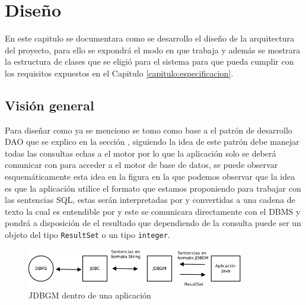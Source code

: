 \chapter{Diseño}\label{cap:disenio}

En este capitulo se documentara como se desarrollo el diseño de la arquitectura del proyecto, para ello se expondrá el modo en que trabaja \jd y además se mostrara la estructura de clases que se eligió para el sistema para que pueda cumplir con los requisitos expuestos en el Capitulo \ref{capitulo:especificacion}.





\section{Visión general}

Para diseñar \jj como ya se menciono se tomo como base a el patrón de desarrollo DAO que se explico en la sección , siguiendo la idea de este patrón \jj debe manejar todas las consultas echas a el motor por lo que la aplicación solo se deberá comunicar con \jj para acceder a el motor de base de datos, se puede observar esquemáticamente esta idea en la figura  en la que podemos observar que la idea es que la aplicación utilice el formato que estamos proponiendo para trabajar con las sentencias SQL, estas serán interpretadas por \jj y convertidas a una cadena de texto la cual es entendible por \jd y este se comunicara directamente con el DBMS y pondrá a disposición de \jj el resultado que dependiendo de la consulta puede ser un objeto del tipo \verb=ResultSet= o un tipo \verb=integer=. 

\begin{figure}
  \centering
    \includegraphics[width=0.85\textwidth]{figuras/jdbgm-overview.png}
  \caption{JDBGM dentro de una aplicación}
  \label{fig:jdbgm:overview}
\end{figure}

